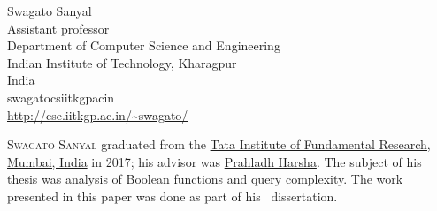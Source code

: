 \documentclass{toc}
\begin{document}

%
%
%


%
%
%
%
%
\begin{tocauthors}
\begin{tocinfo}[sanyal]
 Swagato Sanyal\\
 Assistant professor\\
 Department of Computer Science and Engineering\\
 Indian Institute of Technology, Kharagpur\\
 India\\
 swagato\tocat{}cs\tocdot{}iitkgp\tocdot{}ac\tocdot{}in \\   %
 \url{http://cse.iitkgp.ac.in/~swagato/}      %
\end{tocinfo}
\end{tocauthors}

%
%
%
%
%
%
%
%
%
%
%
%
%
%
\begin{tocaboutauthors}
\begin{tocabout}[sanyal]  %
  \textsc{Swagato Sanyal} graduated from the
  \href{www.tifr.res.in}{Tata Institute of Fundamental Research, Mumbai, India}
  in 2017; his advisor was
  \href{http://www.tcs.tifr.res.in/~prahladh/}{Prahladh Harsha}. The subject of his thesis was analysis of Boolean functions and query complexity. The work presented in this paper was done as part of his \phd\ dissertation.
\end{tocabout}
\end{tocaboutauthors}
\end{document}
